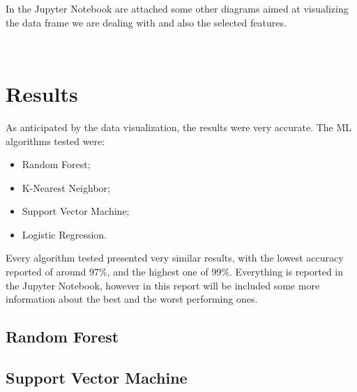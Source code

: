 \documentclass{article}
\begin{document}
In the Jupyter Notebook are attached some other diagrams aimed at visualizing the data frame we are dealing with and also the selected features.

\newpage~\newpage
\section{Results}

As anticipated by the data visualization, the results were very accurate. The ML algorithms tested were:

\begin{itemize}
	\item Random Forest;
	\item K-Nearest Neighbor;
	\item Support Vector Machine;
	\item Logistic Regression.
\end{itemize}
Every algorithm tested presented very similar results, with the lowest accuracy reported of around 97\%, and the highest one of 99\%. Everything is reported in the Jupyter Notebook, however in this report will be included some more information about the best and the worst performing ones.

\subsection[]{Random Forest}

\subsection[]{Support Vector Machine}


 
\end{document}
